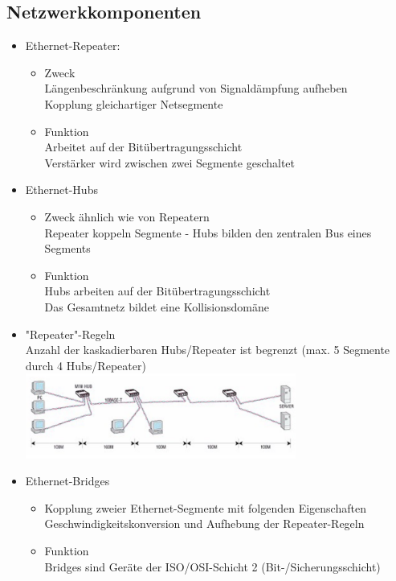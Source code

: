 \documentclass{scrreprt}
\begin{document}
\subsection{Netzwerkkomponenten}
\begin{itemize}
	\item Ethernet-Repeater:
	\begin{itemize}
		\item Zweck
		\\Längenbeschränkung aufgrund von Signaldämpfung aufheben
		\\Kopplung gleichartiger Netsegmente
		\item Funktion
		\\Arbeitet auf der Bitübertragungsschicht
		\\Verstärker wird zwischen zwei Segmente geschaltet
	\end{itemize}
	\item Ethernet-Hubs
 	\begin{itemize}
	 	\item Zweck ähnlich wie von Repeatern
		\\Repeater koppeln Segmente - Hubs bilden den zentralen Bus eines Segments
		\item Funktion
		\\Hubs arbeiten auf der Bitübertragungsschicht
		\\Das Gesamtnetz bildet eine Kollisionsdomäne
 	\end{itemize}
	\item "Repeater"-Regeln
	\\Anzahl der kaskadierbaren Hubs/Repeater ist begrenzt (max. 5 Segmente durch 4 Hubs/Repeater)
	\\\includegraphics[width=0.70\textwidth]{"graphics/repeater-regeln"}
	\item Ethernet-Bridges
	\begin{itemize}
		\item Kopplung zweier Ethernet-Segmente mit folgenden Eigenschaften
		\\Geschwindigkeitskonversion und Aufhebung der Repeater-Regeln
		\item Funktion
		\\Bridges sind Geräte der ISO/OSI-Schicht 2 (Bit-/Sicherungsschicht)

\end{itemize}
\end{itemize}
\end{document}
